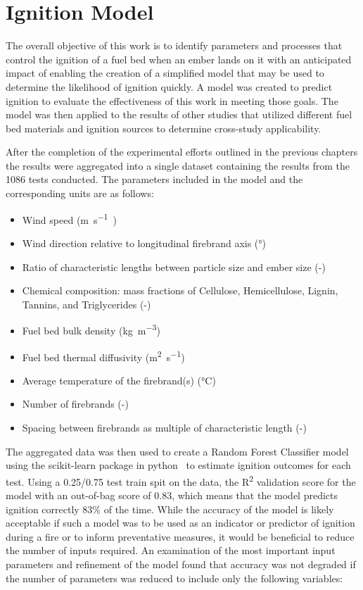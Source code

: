 \section{Ignition Model}
    The overall objective of this work is to identify parameters and processes that control the ignition of a fuel bed when an ember lands on it with an anticipated impact of enabling the creation of a simplified model that may be used to determine the likelihood of ignition quickly. A model was created to predict ignition to evaluate the effectiveness of this work in meeting those goals. The model was then applied to the results of other studies that utilized different fuel bed materials and ignition sources to determine cross-study applicability.
    
    After the completion of the experimental efforts outlined in the previous chapters the results were aggregated into a single dataset containing the results from the 1086 tests conducted. The parameters included in the model and the corresponding units are as follows:
        \begin{itemize}
            \item Wind speed (\si{\meter\per\second)}
            \item Wind direction relative to longitudinal firebrand axis (\si{\degree})
            \item Ratio of characteristic lengths between particle size and ember size (-)
            \item Chemical composition: mass fractions of Cellulose, Hemicellulose, Lignin, Tannins, and Triglycerides (-)
            \item Fuel bed bulk density (\si{\kilo\gram\per\cubic\meter})
            \item Fuel bed thermal diffusivity (\si{\square\meter\per\second})
            \item Average temperature of the firebrand(s) (\si{\celsius})
            \item Number of firebrands (-)
            \item Spacing between firebrands as multiple of characteristic length (-)
        \end{itemize}
    The aggregated data was then used to create a Random Forest Classifier model using the scikit-learn package in python~\cite{scikit-learn} to estimate ignition outcomes for each test. Using a 0.25/0.75 test train spit on the data, the R\textsuperscript{2} validation score for the model with an out-of-bag score of 0.83, which means that the model predicts ignition correctly 83\% of the time. While the accuracy of the model is likely acceptable if such a model was to be used as an indicator or predictor of ignition during a fire or to inform preventative measures, it would be beneficial to reduce the number of inputs required. An examination of the most important input parameters and refinement of the model found that accuracy was not degraded if the number of parameters was reduced to include only the following variables:
